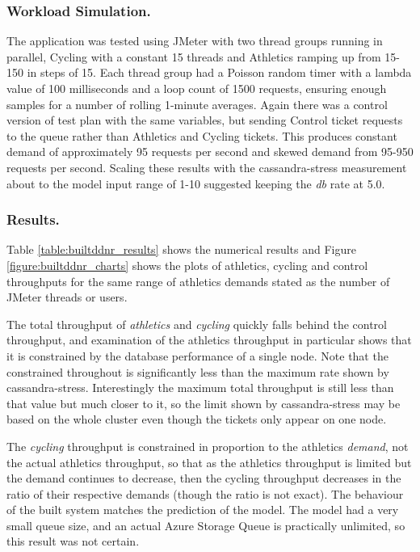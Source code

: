 \subsubsection{Workload Simulation.}  The application was tested using JMeter with two thread groups running in parallel, Cycling with a constant 15 threads and Athletics ramping up from 15-150 in steps of 15.  Each thread group had a Poisson random timer with a lambda value of 100 milliseconds and a loop count of 1500 requests, ensuring enough samples for a number of rolling 1-minute averages.  Again there was a control version of test plan with the same variables, but sending Control ticket requests to the queue rather than Athletics and Cycling tickets.  This produces constant demand of approximately 95 requests per second and skewed demand from 95-950 requests per second.  Scaling these results with the cassandra-stress measurement about to the model input range of 1-10 suggested keeping the {\itshape db} rate at 5.0.

\subsubsection{Results.} 
Table \ref{table:builtddnr_results} shows the numerical results and Figure \ref{figure:builtddnr_charts} shows the plots of athletics, cycling and control throughputs for the same range of athletics demands stated as the number of JMeter threads or users.

The total throughput of {\itshape athletics} and {\itshape cycling} quickly falls behind the control throughput, and examination of the athletics throughput in particular shows that it is constrained by the database performance of a single node.  Note that the constrained throughout is significantly less than the maximum rate shown by cassandra-stress.  Interestingly the maximum total throughput is still less than that value but much closer to it, so the limit shown by cassandra-stress may be based on the whole cluster even though the tickets only appear on one node.

The {\itshape cycling} throughput is constrained in proportion to the athletics {\itshape demand}, not the actual athletics throughput, so that as the athletics throughput is limited but the demand continues to decrease, then the cycling throughput decreases in the ratio of their respective demands (though the ratio is not exact).  The behaviour of the built system matches the prediction of the model.  The model had a very small queue size, and an actual Azure Storage Queue is practically unlimited, so this result was not certain.

